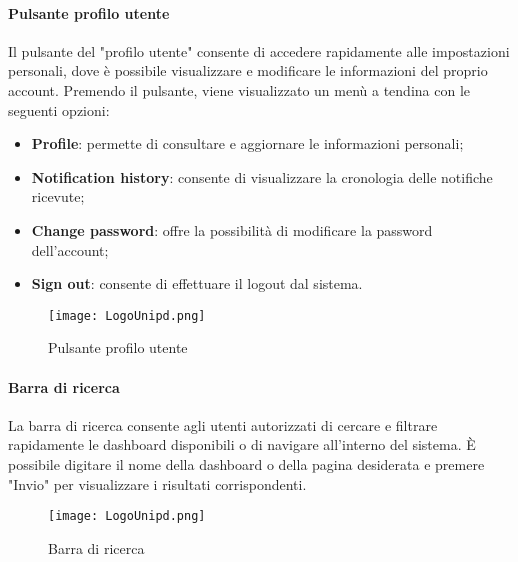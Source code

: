 \documentclass[10pt]{article}
\begin{document}
\begin{justify}
    \paragraph{Pulsante profilo utente}
    Il pulsante del "profilo utente" consente di accedere rapidamente alle impostazioni personali, dove è possibile visualizzare e modificare le informazioni del proprio account. Premendo il pulsante, viene visualizzato un menù a tendina con le seguenti opzioni:
    \begin{itemize}
        \item \textbf{Profile}: permette di consultare e aggiornare le informazioni personali;
        \item \textbf{Notification history}: consente di visualizzare la cronologia delle notifiche ricevute;
        \item \textbf{Change password}: offre la possibilità di modificare la password dell'account;
        \item \textbf{Sign out}: consente di effettuare il logout dal sistema.
    \end{itemize}
    \begin{figure}[H]
    \centering
    \texttt{[image: LogoUnipd.png]}
    \caption{Pulsante profilo utente}
    \end{figure}

    \paragraph{Barra di ricerca}
    La barra di ricerca consente agli utenti autorizzati di cercare e filtrare rapidamente le dashboard disponibili o di navigare all'interno del sistema. È possibile digitare il nome della dashboard o della pagina desiderata e premere "Invio" per visualizzare i risultati corrispondenti.
    \begin{figure}[H]
    \centering
    \texttt{[image: LogoUnipd.png]}
    \caption{Barra di ricerca}
    \end{figure}


\end{justify}
\end{document}

